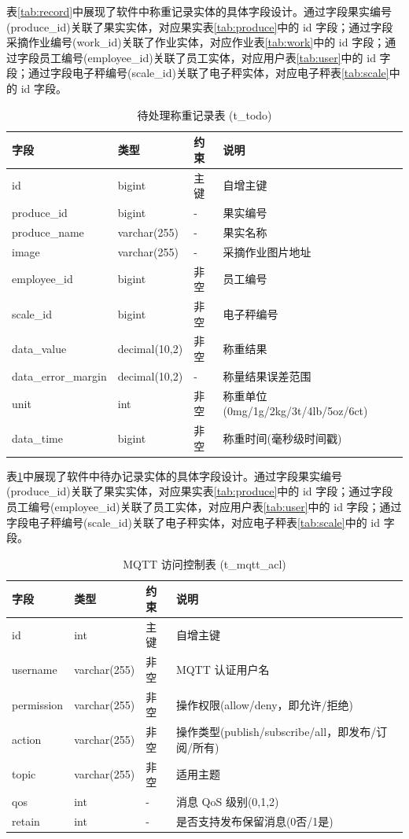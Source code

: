 表\ref{tab:record}中展现了软件中称重记录实体的具体字段设计。通过字段果实编号(produce\_id)关联了果实实体，对应果实表\ref{tab:produce}中的 id 字段；通过字段采摘作业编号(work\_id)关联了作业实体，对应作业表\ref{tab:work}中的 id 字段；通过字段员工编号(employee\_id)关联了员工实体，对应用户表\ref{tab:user}中的 id 字段；通过字段电子秤编号(scale\_id)关联了电子秤实体，对应电子秤表\ref{tab:scale}中的 id 字段。

\begin{table}[H]
\centering
\caption{待处理称重记录表 (t\_todo)}
\label{tab:todo}
\begin{tabular}{|l|l|l|l|}
\hline
字段 & 类型 & 约束 & 说明 \\
\hline
id & bigint & 主键 & 自增主键 \\
produce\_id & bigint & - & 果实编号 \\
produce\_name & varchar(255) & - & 果实名称 \\
image & varchar(255) & - & 采摘作业图片地址 \\
employee\_id & bigint & 非空 & 员工编号 \\
scale\_id & bigint & 非空 & 电子秤编号 \\
data\_value & decimal(10,2) & 非空 & 称重结果 \\
data\_error\_margin & decimal(10,2) & - & 称量结果误差范围 \\
unit & int & 非空 & 称重单位(0mg/1g/2kg/3t/4lb/5oz/6ct) \\
data\_time & bigint & 非空 & 称重时间(毫秒级时间戳) \\
\hline
\end{tabular}
\end{table}

表\ref{tab:todo}中展现了软件中待办记录实体的具体字段设计。通过字段果实编号(produce\_id)关联了果实实体，对应果实表\ref{tab:produce}中的 id 字段；通过字段员工编号(employee\_id)关联了员工实体，对应用户表\ref{tab:user}中的 id 字段；通过字段电子秤编号(scale\_id)关联了电子秤实体，对应电子秤表\ref{tab:scale}中的 id 字段。

\begin{table}[H]
\centering
\caption{MQTT 访问控制表 (t\_mqtt\_acl)}
\label{tab:mqttacl}
\begin{tabular}{|l|l|l|l|}
\hline
字段 & 类型 & 约束 & 说明 \\
\hline
id & int & 主键 & 自增主键 \\
username & varchar(255) & 非空 & MQTT 认证用户名 \\
permission & varchar(255) & 非空 & 操作权限(allow/deny，即允许/拒绝) \\
action & varchar(255) & 非空 & 操作类型(publish/subscribe/all，即发布/订阅/所有) \\
topic & varchar(255) & 非空 & 适用主题 \\
qos & int & - & 消息 QoS 级别(0,1,2) \\
retain & int & - & 是否支持发布保留消息(0否/1是) \\
\hline
\end{tabular}
\end{table}

